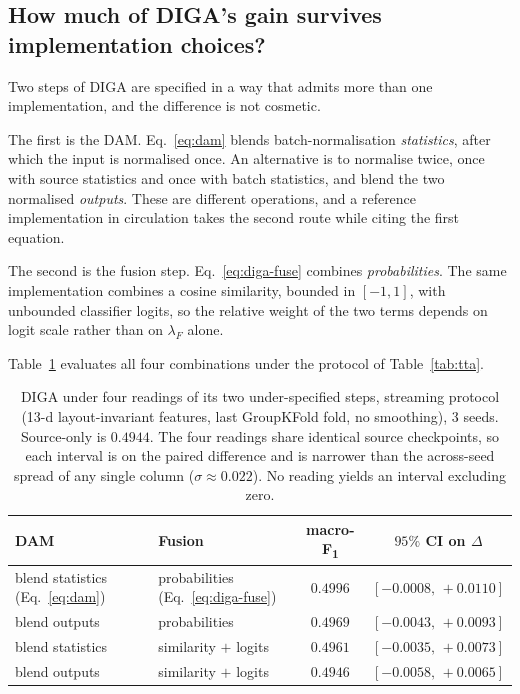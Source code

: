 \documentclass[a4paper,fleqn]{cas-dc}
\newcommand{\macf}{macro-F\textsubscript{1}}
\begin{document}
\subsection{How much of DIGA's gain survives implementation choices?}
\label{sec:res-digaimpl}

Two steps of DIGA are specified in a way that admits more than one implementation, and the
difference is not cosmetic.

The first is the DAM. Eq.~\ref{eq:dam} blends batch-normalisation \emph{statistics}, after
which the input is normalised once. An alternative is to normalise twice, once with source
statistics and once with batch statistics, and blend the two normalised \emph{outputs}. These
are different operations, and a reference implementation in circulation takes the second
route while citing the first equation.

The second is the fusion step. Eq.~\ref{eq:diga-fuse} combines \emph{probabilities}. The
same implementation combines a cosine similarity, bounded in $[-1,1]$, with unbounded
classifier logits, so the relative weight of the two terms depends on logit scale rather
than on $\lambda_F$ alone.

Table~\ref{tab:digaimpl} evaluates all four combinations under the protocol of
Table~\ref{tab:tta}.

\begin{table}[t]
\centering
\caption{DIGA under four readings of its two under-specified steps, streaming protocol
(13-d layout-invariant features, last GroupKFold fold, no smoothing), 3 seeds.
Source-only is $0.4944$. The four readings share identical source checkpoints, so each
interval is on the paired difference and is narrower than the across-seed spread of any
single column ($\sigma\approx0.022$). No reading yields an interval excluding zero.}
\label{tab:digaimpl}
\small
\begin{tabular}{llcc}
\toprule
DAM & Fusion & \macf & $95\%$ CI on $\Delta$ \\
\midrule
blend statistics (Eq.~\ref{eq:dam}) & probabilities (Eq.~\ref{eq:diga-fuse}) & $\mathbf{0.4996}$ & $[-0.0008,\,+0.0110]$ \\
blend outputs & probabilities & $0.4969$ & $[-0.0043,\,+0.0093]$ \\
blend statistics & similarity $+$ logits & $0.4961$ & $[-0.0035,\,+0.0073]$ \\
blend outputs & similarity $+$ logits & $0.4946$ & $[-0.0058,\,+0.0065]$ \\
\bottomrule
\end{tabular}
\end{table}
\end{document}
